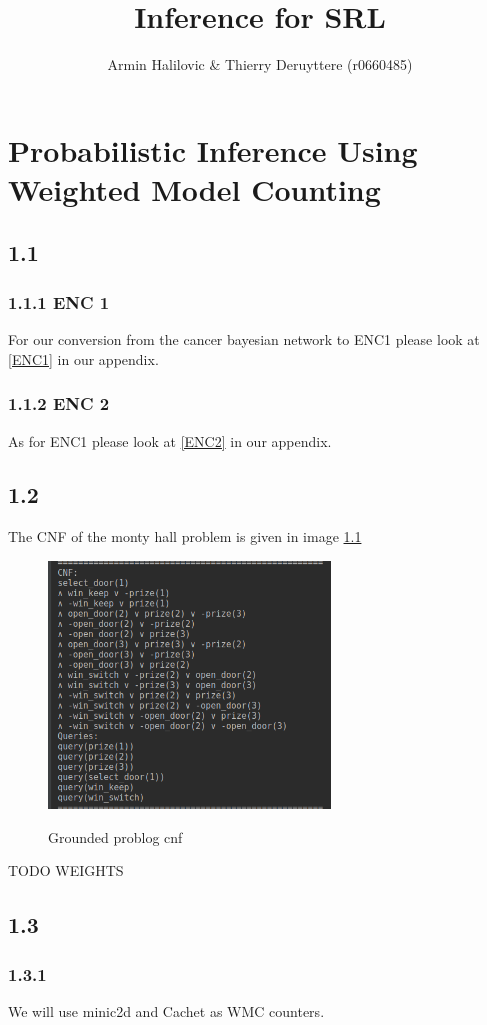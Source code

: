 \documentclass[a4paper,10pt]{report}
\title{Inference for SRL}
\author{Armin Halilovic \& Thierry Deruyttere (r0660485)}
\begin{document}
\maketitle
\chapter{Probabilistic Inference Using Weighted Model Counting}
\section*{1.1}
\subsection*{1.1.1 ENC 1}
For our conversion from the cancer bayesian network to ENC1 please look at \ref{ENC1} in our appendix.
\subsection*{1.1.2 ENC 2}
As for ENC1 please look at \ref{ENC2} in our appendix.

\section*{1.2}
The CNF of the monty hall problem is given in image \ref{CNF}
\begin{figure}[H]
  \includegraphics[width=7.5cm]{GroundProblogCNF.png}
  \label{CNF}
  \caption{Grounded problog cnf}
\end{figure}
TODO WEIGHTS

\section*{1.3}

\subsection*{1.3.1}
We will use minic2d and Cachet as WMC counters.
\end{document}
